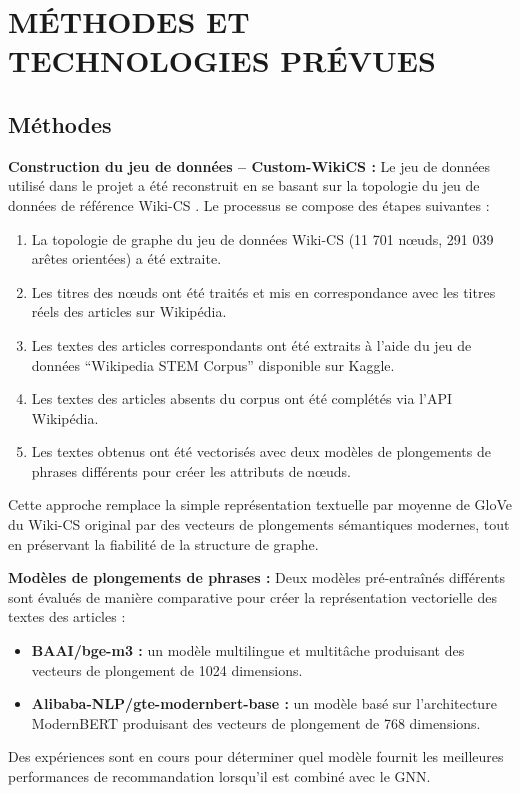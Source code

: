 \chapter{MÉTHODES ET TECHNOLOGIES PRÉVUES}
\thispagestyle{empty}

\section{Méthodes}

\textbf{Construction du jeu de données -- Custom-WikiCS :}
Le jeu de données utilisé dans le projet a été reconstruit en se basant sur la topologie du jeu de données de référence Wiki-CS \cite{mernyei2020wikics}. Le processus se compose des étapes suivantes :
\begin{enumerate}
    \item La topologie de graphe du jeu de données Wiki-CS (11 701 n\oe uds, 291 039 arêtes orientées) a été extraite.
    \item Les titres des n\oe uds ont été traités et mis en correspondance avec les titres réels des articles sur Wikipédia.
    \item Les textes des articles correspondants ont été extraits à l'aide du jeu de données ``Wikipedia STEM Corpus'' disponible sur Kaggle.
    \item Les textes des articles absents du corpus ont été complétés via l'API Wikipédia.
    \item Les textes obtenus ont été vectorisés avec deux modèles de plongements de phrases différents pour créer les attributs de n\oe uds.
\end{enumerate}

Cette approche remplace la simple représentation textuelle par moyenne de GloVe du Wiki-CS original par des vecteurs de plongements sémantiques modernes, tout en préservant la fiabilité de la structure de graphe.

\textbf{Modèles de plongements de phrases :}
Deux modèles pré-entraînés différents sont évalués de manière comparative pour créer la représentation vectorielle des textes des articles :
\begin{itemize}
    \item \textbf{BAAI/bge-m3 :} un modèle multilingue et multitâche produisant des vecteurs de plongement de 1024 dimensions.
    \item \textbf{Alibaba-NLP/gte-modernbert-base :} un modèle basé sur l'architecture ModernBERT produisant des vecteurs de plongement de 768 dimensions.
\end{itemize}
Des expériences sont en cours pour déterminer quel modèle fournit les meilleures performances de recommandation lorsqu'il est combiné avec le GNN.

